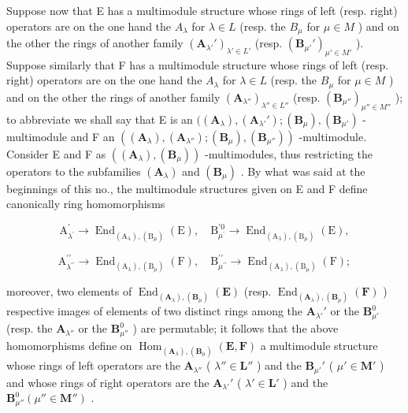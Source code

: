 Suppose now that E has a multimodule structure whose rings of left (resp. right) operators are on the one hand the \(A_{\lambda}\) for \(\lambda \in L\) (resp. the \(B_{\mu}\) for \(\mu \in M\) ) and on the other the rings of another family \((\mathbf{A}_{\lambda'}')_{\lambda' \in L'}\) (resp. \((\mathbf{B}_{\mu'}')_{\mu' \in M'}\) ). Suppose similarly that F has a multimodule structure whose rings of left (resp. right) operators are on the one hand the \(A_{\lambda}\) for \(\lambda \in L\) (resp. the \(B_{\mu}\) for \(\mu \in M\) ) and on the other the rings of another family \((\mathbf{A}_{\lambda''})_{\lambda'' \in L''}\) (resp. \((\mathbf{B}_{\mu''})_{\mu'' \in M''}\) ); to abbreviate we shall say that E is an \(((\mathbf{A}_{\lambda}), (\mathbf{A}_{\lambda'}'); (\mathbf{B}_{\mu}), (\mathbf{B}_{\mu'})\) -multimodule and F an \(((\mathbf{A}_{\lambda}), (\mathbf{A}_{\lambda''}); (\mathbf{B}_{\mu}), (\mathbf{B}_{\mu''}))\) -multimodule. Consider E and F as \(((\mathbf{A}_{\lambda}), (\mathbf{B}_{\mu}))\) -multimodules, thus restricting the operators to the subfamilies \((\mathbf{A}_{\lambda})\) and \((\mathbf{B}_{\mu})\) . By what was said at the beginnings of this no., the multimodule structures given on E and F define canonically ring homomorphisms

\[
\mathrm{A} _ {\lambda^ {\prime}} ^ {\prime} \rightarrow \operatorname{End} _ {(\mathrm{A} _ {\lambda}), (\mathrm{B} _ {\mu})} (\mathrm{E}), \quad \mathrm{B} _ {\mu^ {\prime}} ^ {\prime 0} \rightarrow \operatorname{End} _ {(\mathrm{A} _ {\lambda}), (\mathrm{B} _ {\mu})} (\mathrm{E}),
\]

\[
\mathrm{A} _ {\lambda^ {\prime \prime}} ^ {\prime \prime} \rightarrow \operatorname{End} _ {(\mathrm{A} _ {\lambda}), (\mathrm{B} _ {\mu})} (\mathrm{F}), \quad \mathrm{B} _ {\mu^ {\prime \prime}} ^ {\prime \prime} \rightarrow \operatorname{End} _ {(\mathrm{A} _ {\lambda}), (\mathrm{B} _ {\mu})} (\mathrm{F});
\]

moreover, two elements of \(\operatorname{End}_{(\mathbf{A}_{\lambda}), (\mathbf{B}_{\mu})}(\mathbf{E})\) (resp. \(\operatorname{End}_{(\mathbf{A}_{\lambda}), (\mathbf{B}_{\mu})}(\mathbf{F})\) ) respective images of elements of two distinct rings among the \(\mathbf{A}_{\lambda'}'\) or the \(\mathbf{B}_{\mu'}^{0}\) (resp. the \(\mathbf{A}_{\lambda''}\) or the \(\mathbf{B}_{\mu''}^{0}\) ) are permutable; it follows that the above homomorphisms define on \(\operatorname{Hom}_{(\mathbf{A}_{\lambda}), (\mathbf{B}_{\mu})}(\mathbf{E}, \mathbf{F})\) a multimodule structure whose rings of left operators are the \(\mathbf{A}_{\lambda''}\) ( \(\lambda'' \in \mathbf{L}''\) ) and the \(\mathbf{B}_{\mu'}'\) ( \(\mu' \in \mathbf{M}'\) ) and whose rings of right operators are the \(\mathbf{A}_{\lambda'}'\) ( \(\lambda' \in \mathbf{L}'\) ) and the \(\mathbf{B}_{\mu''}^{0}(\mu'' \in \mathbf{M}'')\) .


